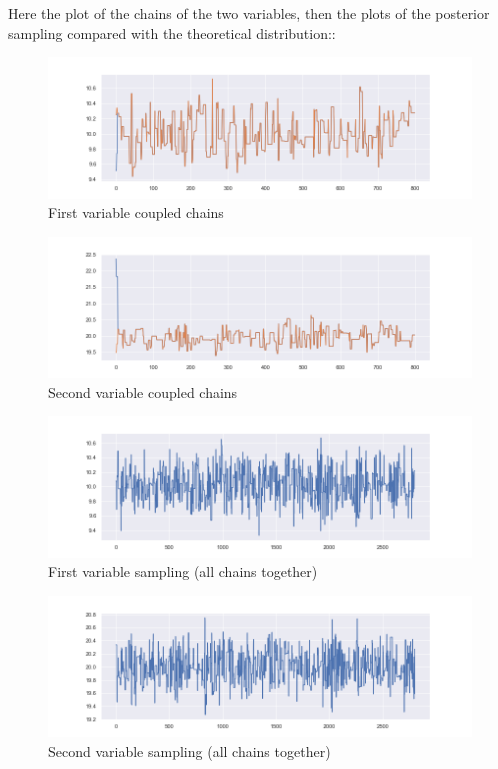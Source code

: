 \documentclass {article}
\begin{document}
Here the plot of the chains of the two variables, then the plots of the posterior sampling compared with the theoretical distribution::
\begin{figure}[h!]
	\centering
	\includegraphics[width=\textwidth]{immagini_coupling_multivariate/coupling_mult_chain_meeeting_1}	
	\caption{First variable coupled chains}
\end{figure}

\begin{figure}[h!]
	\centering
	\includegraphics[width=\textwidth]{immagini_coupling_multivariate/coupling_mult_chain_meeeting_2}	
	\caption{Second variable coupled chains}
\end{figure}



\begin{figure}[h!]
	\centering
	\includegraphics[width=\textwidth]{immagini_coupling_multivariate/coupling_mult_sampling_1}	
	\caption{First variable sampling (all chains together)}
\end{figure}
\begin{figure}[h!]
	\centering
	\includegraphics[width=\textwidth]{immagini_coupling_multivariate/coupling_mult_sampling_2}	
	\caption{Second variable sampling (all chains together)}
\end{figure}
\end{document}
